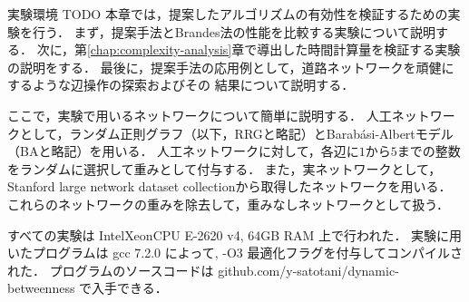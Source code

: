 \documentclass[dvipdfmx,fleqn]{beamer}
\begin{document}
\begin{frame}{実験環境}
  \alert{TODO}
  本章では，提案したアルゴリズムの有効性を検証するための実験を行う．
  まず，提案手法とBrandes法の性能を比較する実験について説明する．
  次に，第\ref{chap:complexity-analysis}章で導出した時間計算量を検証する実験の説明をする．
  最後に，提案手法の応用例として，道路ネットワークを頑健にするような辺操作の探索およびその
  結果について説明する．
  
  ここで，実験で用いるネットワークについて簡単に説明する．
  人工ネットワークとして，ランダム正則グラフ（以下，RRGと略記）とBarab{\'{a}}si-Albertモデル（BAと略記）を用いる．
  人工ネットワークに対して，各辺に$1$から$5$までの整数をランダムに選択して重みとして付与する．
  また，実ネットワークとして，Stanford large network dataset collection\cite{32Leskovec2016}から取得したネットワークを用いる．
  これらのネットワークの重みを除去して，重みなしネットワークとして扱う．
  
  すべての実験は Intel\textsuperscript\textregistered Xeon\textsuperscript\textregistered CPU E-2620 v4, 64GB RAM 上で行われた．
  実験に用いたプログラムは gcc 7.2.0 によって, -O3 最適化フラグを付与してコンパイルされた．
  プログラムのソースコードは github.com/y-satotani/dynamic-betweenness で入手できる．
\end{frame}
\end{document}
